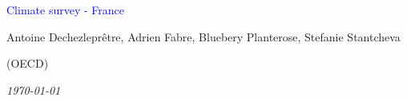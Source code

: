 



%
              





\begin{frame}
\thispagestyle{empty}
\begin{center}
\begin{LARGE}
\textcolor{blue}{Climate survey - France}
\end{LARGE}

\vspace{1cm}


Antoine Dechezleprêtre, Adrien Fabre, Bluebery Planterose, Stefanie Stantcheva 

\vspace{-0.3cm}
(OECD)

\textit{\today} 

\end{center}

\bigskip


\end{frame}

